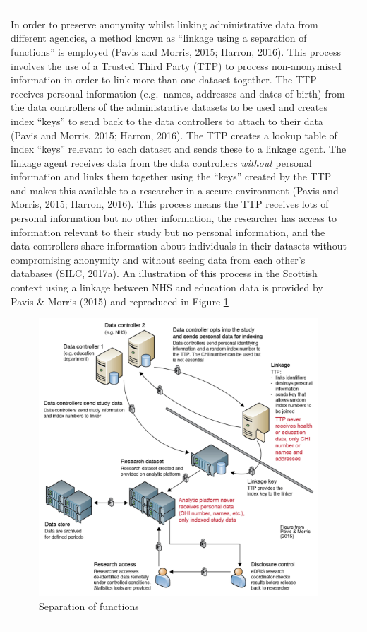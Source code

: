 \documentclass[12pt,a4paper,oneside,table]{report}
\begin{document}
\begin{tabular}[t]{ll}
In order to preserve anonymity whilst linking administrative data from
different agencies, a method known as ``linkage using a separation of
functions'' is employed (Pavis and Morris, 2015; Harron, 2016). This
process involves the use of a Trusted Third Party (TTP) to process
non-anonymised information in order to link more than one dataset
together. The TTP receives personal information (e.g.~names, addresses
and dates-of-birth) from the data controllers of the administrative
datasets to be used and creates index ``keys'' to send back to the data
controllers to attach to their data (Pavis and Morris, 2015; Harron,
2016). The TTP creates a lookup table of index ``keys'' relevant to each
dataset and sends these to a linkage agent. The linkage agent receives
data from the data controllers \textit{without} personal information and
links them together using the ``keys'' created by the TTP and makes this
available to a researcher in a secure environment (Pavis and Morris,
2015; Harron, 2016). This process means the TTP receives lots of
personal information but no other information, the researcher has access
to information relevant to their study but no personal information, and
the data controllers share information about individuals in their
datasets without compromising anonymity and without seeing data from
each other's databases (SILC, 2017a). An illustration of this process in
the Scottish context using a linkage between NHS and education data is
provided by Pavis \& Morris (2015) and reproduced in Figure
\ref{fig:methods-sep-funcs}

\begin{figure}
  \centering
    \includegraphics{figures/chapter-methods/sep-of-funcs.pdf}
    \caption{Separation of functions}
    \label{fig:methods-sep-funcs}
\end{figure}


\end{tabular}
\end{document}
